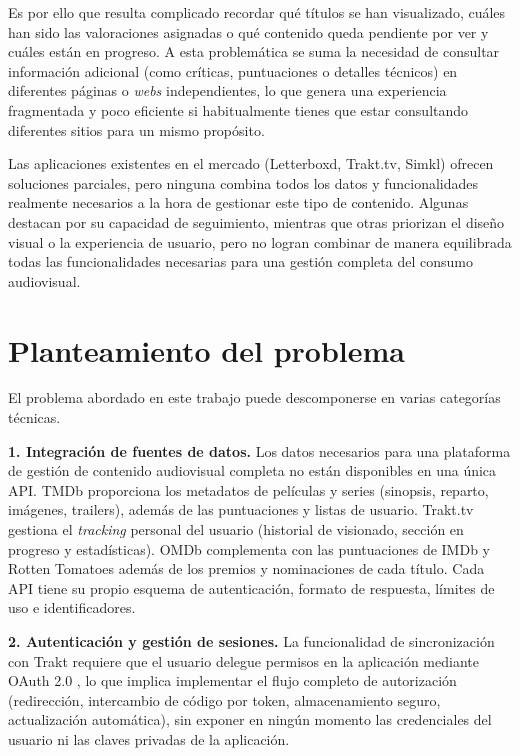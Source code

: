 Es por ello que resulta complicado recordar qué títulos se han visualizado, cuáles han sido las valoraciones asignadas o qué contenido queda pendiente por ver y cuáles están en progreso. A esta problemática se suma la necesidad de consultar información adicional (como críticas, puntuaciones o detalles técnicos) en diferentes páginas o \textit{webs} independientes, lo que genera una experiencia fragmentada y poco eficiente si habitualmente tienes que estar consultando diferentes sitios para un mismo propósito.

Las aplicaciones existentes en el mercado (Letterboxd, Trakt.tv, Simkl) ofrecen soluciones parciales, pero ninguna combina todos los datos y funcionalidades realmente necesarios a la hora de gestionar este tipo de contenido. Algunas destacan por su capacidad de seguimiento, mientras que otras priorizan el diseño visual o la experiencia de usuario, pero no logran combinar de manera equilibrada todas las funcionalidades necesarias para una gestión completa del consumo audiovisual.

\section{Planteamiento del problema}

El problema abordado en este trabajo puede descomponerse en varias categorías técnicas.

\textbf{1. Integración de fuentes de datos.} Los datos necesarios para una plataforma de gestión de contenido audiovisual completa no están disponibles en una única API. TMDb \parencite{TMDb:2024} proporciona los metadatos de películas y series (sinopsis, reparto, imágenes, trailers), además de las puntuaciones y listas de usuario. Trakt.tv \parencite{Trakt:2024} gestiona el \textit{tracking} personal del usuario (historial de visionado, sección en progreso y estadísticas). OMDb \parencite{OMDb:2024} complementa con las puntuaciones de IMDb y Rotten Tomatoes además de los premios y nominaciones de cada título. Cada API tiene su propio esquema de autenticación, formato de respuesta, límites de uso e identificadores.

\textbf{2. Autenticación y gestión de sesiones.} La funcionalidad de sincronización con Trakt requiere que el usuario delegue permisos en la aplicación mediante OAuth 2.0 \parencite{OWASP:2021}, lo que implica implementar el flujo completo de autorización (redirección, intercambio de código por token, almacenamiento seguro, actualización automática), sin exponer en ningún momento las credenciales del usuario ni las claves privadas de la aplicación.

